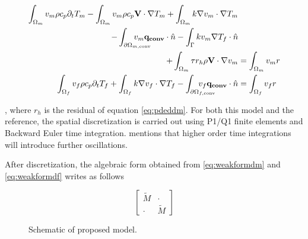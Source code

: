 \begin{align}
  \label{eq:weakformdm}
    \int_{\Omega_m} v_m \rho c_p \partial_t T_m 
  - \int_{\Omega_m} v_m \rho c_p \mathbf{V} \cdot \nabla T_m
  + \int_{\Omega_m} k \nabla v_m \cdot \nabla T_m&\\
  - \int_{\partial \Omega_{m, \textrm{conv}}} \hspace{-8mm} v_m \mathbf{q_{conv}} \cdot \hat{n}
  - \int_{\Gamma} k v_m \nabla T_f \cdot \hat{n} &\notag\\
  + \int_{\Omega_m} \tau r_h  \rho \mathbf{V} \cdot \nabla v_m &= \int_{\Omega_m} v_m r \notag\\
  \label{eq:weakformdf}
    \int_{\Omega_f} v_f \rho c_p \partial_t T_f 
  + \int_{\Omega_f} k \nabla v_f \cdot \nabla T_f
  - \int_{\partial \Omega_{f, \textrm{conv}}} \hspace{-8mm} v_f \mathbf{q_{conv}} \cdot \hat{n} &= \int_{\Omega_f} v_f r
\end{align}

, where $r_h$ is the residual of equation \ref{eq:pdeddm}.
For both this model and the reference, the spatial discretization
is carried out using P1/Q1 finite elements and Backward Euler
time integration. \citep{Puso2023} mentions that higher order
time integrations will introduce further oscillations.\par

After discretization, the algebraic form obtained from
\ref{eq:weakformdm} and \ref{eq:weakformdf} writes as follows

\begin{equation}\label{eq:algebraic_coupled}
  \begin{bmatrix}
    \tilde{M} & \cdot \\
    \cdot & \tilde{M}
  \end{bmatrix}
\end{equation}

\par
{}\par

\begin{figure}
  \caption{Schematic of proposed model.}
  \label{fig:schematic}
\end{figure}


\iffalse
Show reference model
Go over limitations
Introduce my model
\fi
